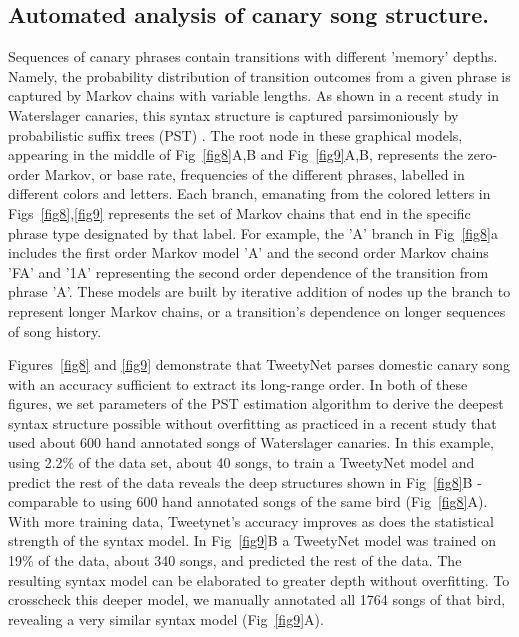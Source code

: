 \documentclass[10pt,letterpaper]{article}
\begin{document}
\subsection*{Automated analysis of canary song structure. }

Sequences of canary phrases contain transitions with different 'memory' depths. Namely, the probability distribution of transition outcomes from a given phrase is captured by Markov chains with variable lengths. As shown in a recent study in Waterslager canaries, this syntax structure is captured parsimoniously by probabilistic suffix trees (PST) \cite{ron_power_1996,markowitz_long-range_2013}. 
The root node in these graphical models, appearing in the middle of Fig~\ref{fig8}A,B and Fig~\ref{fig9}A,B, represents the zero-order Markov, or base rate, frequencies of the different phrases, labelled in different colors and letters. Each branch, emanating from the colored letters in Figs~\ref{fig8},\ref{fig9} represents the set of Markov chains that end in the specific phrase type designated by that label. For example, the 'A' branch in Fig~\ref{fig8}a includes the first order Markov model 'A' and the second order Markov chains 'FA' and '1A' representing the second order dependence of the transition from phrase 'A'.
These models are built by iterative addition of nodes up the branch to represent longer Markov chains, or a transition's dependence on longer sequences of song history. 

Figures~\ref{fig8} and \ref{fig9} demonstrate that TweetyNet parses domestic canary song with an accuracy sufficient to extract its long-range order. In both of these figures, we set parameters of the PST estimation algorithm to derive the deepest syntax structure possible without overfitting as practiced in a recent study \cite{markowitz_long-range_2013} that used about 600 hand annotated songs of Waterslager canaries. In this example, using 2.2\% of the data set, about 40 songs, to train a TweetyNet model and predict the rest of the data reveals the deep structures shown in Fig~\ref{fig8}B - comparable to using 600 hand annotated songs of the same bird (Fig~\ref{fig8}A). With more training data, Tweetynet's accuracy improves as does the statistical strength of the syntax model. In Fig~\ref{fig9}B a TweetyNet model was trained on 19\% of the data, about 340 songs, and predicted the rest of the data. The resulting syntax model can be elaborated to greater depth without overfitting. To crosscheck this deeper model, we manually annotated all 1764 songs of that bird, revealing a very similar syntax model (Fig~\ref{fig9}A).
\end{document}
